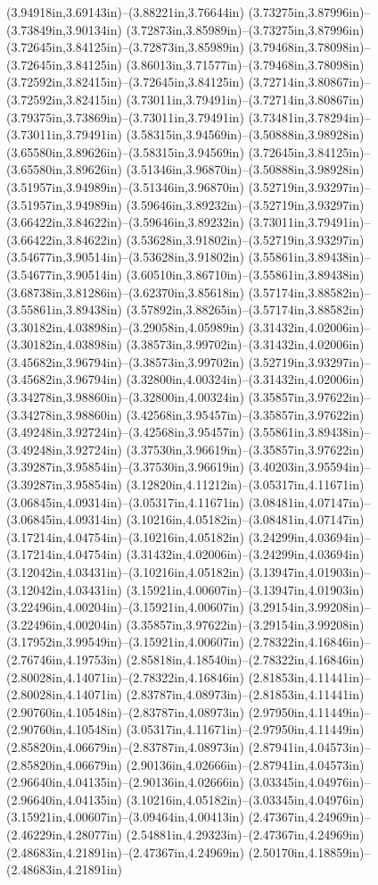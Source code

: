 (3.94918in,3.69143in)--(3.88221in,3.76644in) (3.73275in,3.87996in)--(3.73849in,3.90134in) (3.72873in,3.85989in)--(3.73275in,3.87996in) (3.72645in,3.84125in)--(3.72873in,3.85989in) (3.79468in,3.78098in)--(3.72645in,3.84125in) (3.86013in,3.71577in)--(3.79468in,3.78098in) (3.72592in,3.82415in)--(3.72645in,3.84125in) (3.72714in,3.80867in)--(3.72592in,3.82415in) (3.73011in,3.79491in)--(3.72714in,3.80867in) (3.79375in,3.73869in)--(3.73011in,3.79491in) (3.73481in,3.78294in)--(3.73011in,3.79491in) (3.58315in,3.94569in)--(3.50888in,3.98928in) (3.65580in,3.89626in)--(3.58315in,3.94569in) (3.72645in,3.84125in)--(3.65580in,3.89626in) (3.51346in,3.96870in)--(3.50888in,3.98928in) (3.51957in,3.94989in)--(3.51346in,3.96870in) (3.52719in,3.93297in)--(3.51957in,3.94989in) (3.59646in,3.89232in)--(3.52719in,3.93297in) (3.66422in,3.84622in)--(3.59646in,3.89232in) (3.73011in,3.79491in)--(3.66422in,3.84622in) (3.53628in,3.91802in)--(3.52719in,3.93297in) (3.54677in,3.90514in)--(3.53628in,3.91802in) (3.55861in,3.89438in)--(3.54677in,3.90514in) (3.60510in,3.86710in)--(3.55861in,3.89438in) (3.68738in,3.81286in)--(3.62370in,3.85618in) (3.57174in,3.88582in)--(3.55861in,3.89438in) (3.57892in,3.88265in)--(3.57174in,3.88582in) (3.30182in,4.03898in)--(3.29058in,4.05989in) (3.31432in,4.02006in)--(3.30182in,4.03898in) (3.38573in,3.99702in)--(3.31432in,4.02006in) (3.45682in,3.96794in)--(3.38573in,3.99702in) (3.52719in,3.93297in)--(3.45682in,3.96794in) (3.32800in,4.00324in)--(3.31432in,4.02006in) (3.34278in,3.98860in)--(3.32800in,4.00324in) (3.35857in,3.97622in)--(3.34278in,3.98860in) (3.42568in,3.95457in)--(3.35857in,3.97622in) (3.49248in,3.92724in)--(3.42568in,3.95457in) (3.55861in,3.89438in)--(3.49248in,3.92724in) (3.37530in,3.96619in)--(3.35857in,3.97622in) (3.39287in,3.95854in)--(3.37530in,3.96619in) (3.40203in,3.95594in)--(3.39287in,3.95854in) (3.12820in,4.11212in)--(3.05317in,4.11671in) (3.06845in,4.09314in)--(3.05317in,4.11671in) (3.08481in,4.07147in)--(3.06845in,4.09314in) (3.10216in,4.05182in)--(3.08481in,4.07147in) (3.17214in,4.04754in)--(3.10216in,4.05182in) (3.24299in,4.03694in)--(3.17214in,4.04754in) (3.31432in,4.02006in)--(3.24299in,4.03694in) (3.12042in,4.03431in)--(3.10216in,4.05182in) (3.13947in,4.01903in)--(3.12042in,4.03431in) (3.15921in,4.00607in)--(3.13947in,4.01903in) (3.22496in,4.00204in)--(3.15921in,4.00607in) (3.29154in,3.99208in)--(3.22496in,4.00204in) (3.35857in,3.97622in)--(3.29154in,3.99208in) (3.17952in,3.99549in)--(3.15921in,4.00607in) (2.78322in,4.16846in)--(2.76746in,4.19753in) (2.85818in,4.18540in)--(2.78322in,4.16846in) (2.80028in,4.14071in)--(2.78322in,4.16846in) (2.81853in,4.11441in)--(2.80028in,4.14071in) (2.83787in,4.08973in)--(2.81853in,4.11441in) (2.90760in,4.10548in)--(2.83787in,4.08973in) (2.97950in,4.11449in)--(2.90760in,4.10548in) (3.05317in,4.11671in)--(2.97950in,4.11449in) (2.85820in,4.06679in)--(2.83787in,4.08973in) (2.87941in,4.04573in)--(2.85820in,4.06679in) (2.90136in,4.02666in)--(2.87941in,4.04573in) (2.96640in,4.04135in)--(2.90136in,4.02666in) (3.03345in,4.04976in)--(2.96640in,4.04135in) (3.10216in,4.05182in)--(3.03345in,4.04976in) (3.15921in,4.00607in)--(3.09464in,4.00413in) (2.47367in,4.24969in)--(2.46229in,4.28077in) (2.54881in,4.29323in)--(2.47367in,4.24969in) (2.48683in,4.21891in)--(2.47367in,4.24969in) (2.50170in,4.18859in)--(2.48683in,4.21891in) 